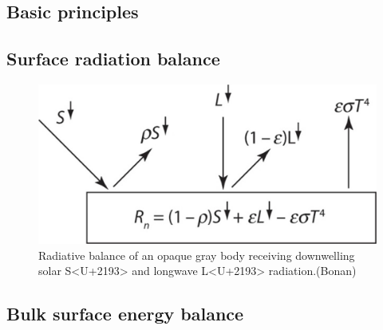 \documentclass[
  oneside]{book}
\begin{document}
\hypertarget{basic-principles}{%
\subsection{Basic principles}\label{basic-principles}}

\hypertarget{surface-radiation-balance}{%
\subsection{Surface radiation balance}\label{surface-radiation-balance}}

\begin{figure}

{\centering \includegraphics[width=0.8\linewidth]{figures/chap3/f329_rad_balance} 

}

\caption{Radiative balance of an opaque gray body receiving downwelling solar S<U+2193> and longwave L<U+2193> radiation.(Bonan)}\label{fig:f329}
\end{figure}

\hypertarget{bulk-surface-energy-balance}{%
\subsection{Bulk surface energy balance}\label{bulk-surface-energy-balance}}
\end{document}

